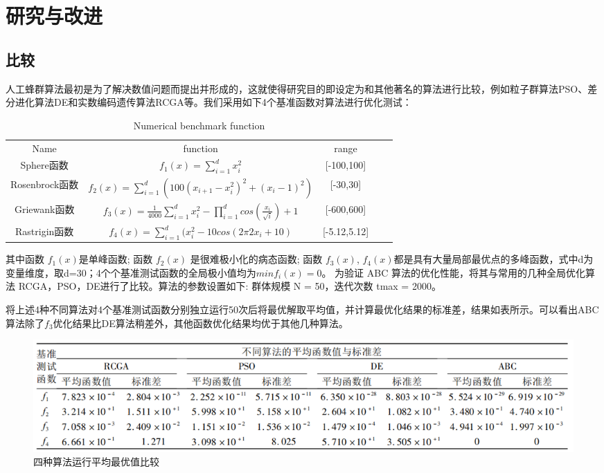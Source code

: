 \documentclass[a4paper,12pt]{report}
\begin{document}
\chapter{研究与改进}

\begin{spacing}{1.5}
\section{比较}
	人工蜂群算法最初是为了解决数值问题而提出并形成的，这就使得研究目的即设定为和其他著名的算法进行比较，例如粒子群算法PSO、差分进化算法DE和实数编码遗传算法RCGA等。我们采用如下4个基准函数对算法进行优化测试：
	
	\begin{table}[!htbp]
		\centering
		\caption{Numerical benchmark function}
		\label{my-label}
		\begin{tabular}{|c|c|c|cc}
		\cline{1-2}
		Name     		& function  														& range 		&  &  \\ \cline{1-3}
		Sphere函数 		& $f_{1}(x)= \sum_{i=1}^d x_{i}^2 $     							& [-100,100]	&  &\\ \cline{1-3}
		Rosenbrock函数	& $f_{2}(x)= \sum_{i=1}^d (100(x_{i+1}-x_{i}^2)^2 + (x_{i} - 1)^2 ) $ 	& [-30,30] 		&  &  \\ \cline{1-3}
		Griewank函数    	& $f_{3}(x)= \frac{1}{4000} \sum_{i=1}^d x_{i}^2 -  \prod_{i=1}^d cos(\frac{x_{i}}{\sqrt{i}}) + 1 $   	& [-600,600]	&  &  \\ \cline{1-3}
		Rastrigin函数   	& $f_{4}(x)=\sum_{i=1}^d (x_{i}^2 - 10cos(2   \pi 2 x_{i} + 10)$     	& [-5.12,5.12] 	&  &  \\ \cline{1-3}
		\end{tabular}
	\end{table}

其中函数 $ f_{1}(x) $是单峰函数; 函数 $ f_{2}(x) $ 是很难极小化的病态函数; 函数 $ f_{3}(x) $, $ f_{4}(x) $都是具有大量局部最优点的多峰函数，式中d为变量维度，取d=30；4个个基准测试函数的全局极小值均为$ minf_{i}(x) = 0$。 为验证 ABC 算法的优化性能，将其与常用的几种全局优化算法 RCGA，PSO，DE进行了比较。算法的参数设置如下: 群体规模 N = 50，迭代次数 tmax = 2000。

将上述4种不同算法对4个基准测试函数分别独立运行50次后将最优解取平均值，并计算最优化结果的标准差，结果如表所示。可以看出ABC算法除了$f_{3}$优化结果比DE算法稍差外，其他函数优化结果均优于其他几种算法。
		\begin{figure}[htbp]
			\centering
			\includegraphics[width=1.0\textwidth]{pic/bee10.png}
			\caption{四种算法运行平均最优值比较}
			\label{fig:pt3}
		\end{figure}


\end{spacing}
\end{document}
